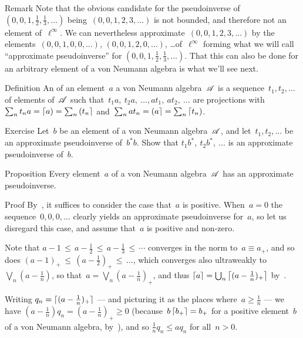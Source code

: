 \documentclass[a]{subfiles}
\begin{document}
\begin{parsec}%
\begin{point}{Remark}%
Note that the obvious candidate
for the pseudoinverse of~$(0,0,1,\frac{1}{2},\frac{1}{3},\dotsc)$
being~$(0,0,1,2,3,\dotsc)$
is not bounded,
and therefore not an element of~$\ell^\infty$.
We can nevertheless approximate~$(0,0,1,2,3,\dotsc)$
by the elements~$(0,0,1,0,0,\dotsc)$,
$(0,0,1,2,0,\dotsc)$, \dots of~$\ell^\infty$
forming what we will call ``approximate pseudoinverse'' for 
$(0,0,1,\frac{1}{2},\frac{1}{3},\dotsc)$.
That this can also be done for an arbitrary element
of a von Neumann algebra
is what we'll see next.
\end{point}
\begin{point}{Definition}%
An 
of an element~$a$ a von Neumann algebra~$\mathscr{A}$
is a sequence~$t_1,t_2,\dotsc$
of elements of~$\mathscr{A}$
such that~$t_1a,\ t_2a,\ \dotsc, at_1,\ at_2,\ \dotsc$
are projections with $\sum_n t_na = \left\lceil a\right)=\sum_n \left(t_n\right\rceil$
and~$\sum_n at_n =\left(a\right\rceil=\sum_n \left\lceil t_n\right)$.
\end{point}
\begin{point}{Exercise}%
Let~$b$ be an element of a von Neumann algebra~$\mathscr{A}$,
and let~$t_1,t_2,\dotsc$
be an approximate pseudoinverse
of~$b^*b$.
Show that $t_1b^*,\ t_2b^*,\ \dotsc$
is an approximate pseudoinverse of~$b$.
\end{point}
\begin{point}{Proposition}%
Every element~$a$ of a von Neumann algebra~$\mathscr{A}$
has an approximate pseudoinverse.
\begin{point}{Proof}%
By~,
it suffices to consider the case that~$a$ is positive.
When~$a=0$ the sequence~$0,0,0,\dotsc$
clearly yields an approximate pseudoinverse for~$a$,
so let us disregard this case,
and assume that~$a$ is positive and non-zero.

Note that $a-1 \,\leq\, a-\frac{1}{2}\,\leq\, a - \frac{1}{3}\,\leq\, \dotsb$
converges in the norm to~$a\equiv a_+$,
and so does $(a-1)_+\,\leq\,(a-\frac{1}{2})_+\,\leq\,\dotsc$,
which converges also ultraweakly to~$\bigvee_n(a-\frac{1}{n})$,
so that~$a=\bigvee_n (a-\frac{1}{n})_+$,
and thus $\left\lceil a\right\rceil=\bigcup_n \left\lceil(a-\frac{1}{n})_+\right\rceil$
by~.

Writing $q_n=
\left\lceil\smash{(a-\frac{1}{n})_+}\right\rceil$
--- and picturing it as the places where~$a\geq \frac{1}{n}$ ---
we have $(a-\frac{1}{n})q_n = (a-\frac{1}{n})_+\geq 0$
(because~$b\left\lceil b_+\right\rceil=b_+$
for a positive element~$b$ of a von Neumann algebra,
by~),
and so $\frac{1}{n}q_n \leq  aq_n$ for all~$n>0$.


\end{point}
\end{point}
\end{parsec}
\end{document}
